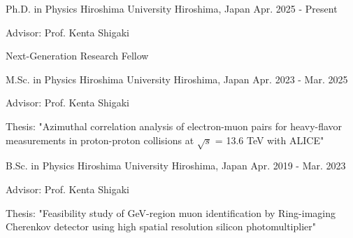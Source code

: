 

\begin{cventries}

  \cventry
    {Ph.D. in Physics} %
    {Hiroshima University} %
    {Hiroshima, Japan} %
    {Apr. 2025 - Present} %
    {
      \begin{cvitems} %
        \item {Advisor: Prof. Kenta Shigaki}
        \item {Next-Generation Research Fellow}
      \end{cvitems}
    }

  \cventry
    {M.Sc. in Physics} %
    {Hiroshima University} %
    {Hiroshima, Japan} %
    {Apr. 2023 - Mar. 2025} %
    {
      \begin{cvitems} %
        \item {Advisor: Prof. Kenta Shigaki}
        \item {Thesis: "Azimuthal correlation analysis of electron-muon pairs for heavy-flavor measurements in proton-proton collisions at $\sqrt{s}$ = 13.6 TeV with ALICE"}
      \end{cvitems}
    }

  \cventry
    {B.Sc. in Physics} %
    {Hiroshima University} %
    {Hiroshima, Japan} %
    {Apr. 2019 - Mar. 2023} %
    {
      \begin{cvitems} %
        \item {Advisor: Prof. Kenta Shigaki}
        \item {Thesis: "Feasibility study of GeV-region muon identification by Ring-imaging Cherenkov detector using high spatial resolution silicon photomultiplier"}
      \end{cvitems}
    }

\end{cventries}